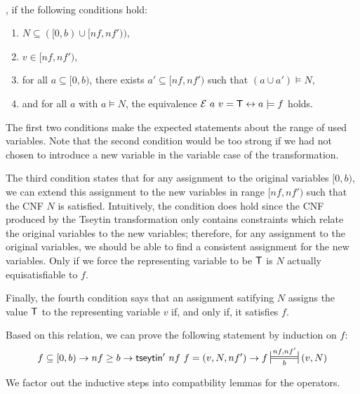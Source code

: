 \newcommand{\Frepr}[3]{\sdststile{\ensuremath{#3}}{\ensuremath{#1, #2}}}
\begin{definition}~\\
  \mnotec{$f \Frepr{nf}{nf'}{b} (v, N)$}, if the following conditions hold:
  \begin{enumerate}
    \item $N \subseteq ([0, b) \cup [nf, nf'))$,
    \item $v \in [nf, nf')$,
    \item for all $a \subseteq [0, b)$, there exists $a' \subseteq [nf, nf')$ such that $(a \cup a') \models N$,
    \item and for all $a$ with $a \models N$, the equivalence $\mathcal{E}~a~v = \mathsf{T} \leftrightarrow a \models f$ holds.
  \end{enumerate}
\end{definition}

The first two conditions make the expected statements about the range of used variables. Note that the second condition would be too strong if we had not chosen to introduce a new variable in the variable case of the transformation.

The third condition states that for any assignment to the original variables $[0, b)$, we can extend this assignment to the new variables in range $[nf, nf')$ such that the CNF $N$ is satisfied. 
Intuitively, the condition does hold since the CNF produced by the Tseytin transformation only contains constraints which relate the original variables to the new variables; therefore, for any assignment to the original variables, we should be able to find a consistent assignment for the new variables. 
Only if we force the representing variable to be $\mathsf{T}$ is $N$ actually equisatisfiable to $f$.

Finally, the fourth condition says that an assignment satifying $N$ assigns the value $\mathsf{T}$ to the representing variable $v$ if, and only if, it satisfies $f$. 

Based on this relation, we can prove the following statement by induction on $f$: 
\[f \subseteq [0, b) \rightarrow nf \ge b \rightarrow \tseytin'~nf~f = (v, N, nf') \rightarrow f \Frepr{nf}{nf'}{b} (v, N) \]

We factor out the inductive steps into compatbility lemmas for the operators. 

